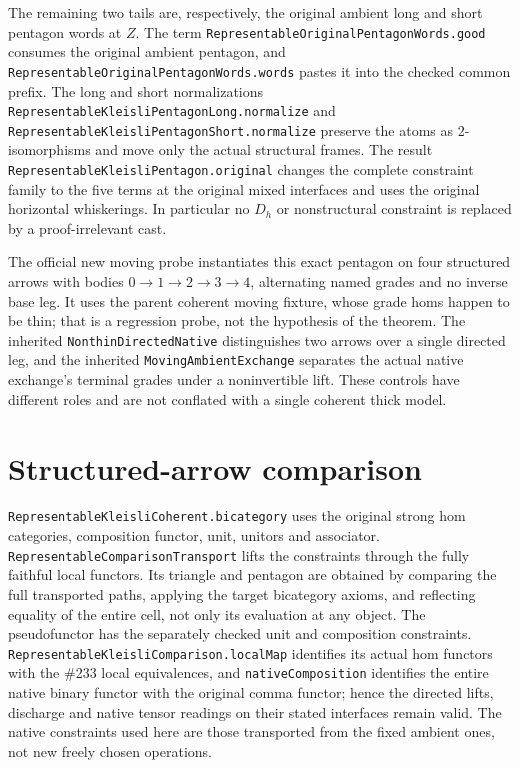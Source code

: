 \documentclass[11pt]{article}
\newcommand{\code}[1]{\nolinkurl{#1}}
\begin{document}
The remaining two tails are, respectively, the original ambient long and
short pentagon words at \(Z\). The term
\code{RepresentableOriginalPentagonWords.good} consumes the original
ambient pentagon, and \code{RepresentableOriginalPentagonWords.words}
pastes it into the checked common prefix. The long and short
normalizations \code{RepresentableKleisliPentagonLong.normalize} and
\code{RepresentableKleisliPentagonShort.normalize} preserve the atoms
as 2-isomorphisms and move only the actual structural frames. The
result \code{RepresentableKleisliPentagon.original} changes the complete
constraint family to the five terms at the original mixed interfaces and
uses the original horizontal whiskerings. In particular no \(D_h\) or
nonstructural constraint is replaced by a proof-irrelevant cast.

The official new moving probe instantiates this exact pentagon on four
structured arrows with bodies \(0\to1\to2\to3\to4\), alternating named
grades and no inverse base leg. It uses the parent coherent moving
fixture, whose grade homs happen to be thin; that is a regression probe,
not the hypothesis of the theorem. The inherited \code{NonthinDirectedNative}
distinguishes two arrows over a single directed leg, and the inherited
\code{MovingAmbientExchange} separates the actual native exchange's
terminal grades under a noninvertible lift. These controls have different
roles and are not conflated with a single coherent thick model.

\section*{Structured-arrow comparison}
\code{RepresentableKleisliCoherent.bicategory} uses the original strong
hom categories, composition functor, unit, unitors and associator.
\code{RepresentableComparisonTransport} lifts the constraints through
the fully faithful local functors. Its triangle and pentagon are obtained
by comparing the full transported paths, applying the target bicategory
axioms, and reflecting equality of the entire cell, not only its
evaluation at any object. The pseudofunctor has the separately checked
unit and composition constraints. \code{RepresentableKleisliComparison.localMap}
identifies its actual hom functors with the \#233 local equivalences, and
\code{nativeComposition} identifies the entire native binary functor with
the original comma functor; hence the directed lifts, discharge and
native tensor readings on their stated interfaces remain valid. The
native constraints used here are those transported from the fixed
ambient ones, not new freely chosen operations.
\end{document}
